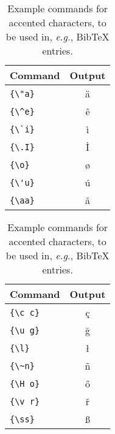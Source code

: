 \documentclass{article}
\begin{document}
\begin{table}
    \centering
    \begin{tabular}{lc}
        \hline
        \textbf{Command} & \textbf{Output} \\
        \hline
        \verb|{\"a}|     & {\"a}           \\
        \verb|{\^e}|     & {\^e}           \\
        \verb|{\`i}|     & {\`i}           \\
        \verb|{\.I}|     & {\.I}           \\
        \verb|{\o}|      & {\o}            \\
        \verb|{\'u}|     & {\'u}           \\
        \verb|{\aa}|     & {\aa}           \\\hline
    \end{tabular}
    \begin{tabular}{lc}
        \hline
        \textbf{Command} & \textbf{Output} \\
        \hline
        \verb|{\c c}|    & {\c c}          \\
        \verb|{\u g}|    & {\u g}          \\
        \verb|{\l}|      & {\l}            \\
        \verb|{\~n}|     & {\~n}           \\
        \verb|{\H o}|    & {\H o}          \\
        \verb|{\v r}|    & {\v r}          \\
        \verb|{\ss}|     & {\ss}           \\
        \hline
    \end{tabular}
    \caption{Example commands for accented characters, to be used in, \emph{e.g.}, Bib\TeX{} entries.}
    \label{tab:accents}
\end{table}
\end{document}

